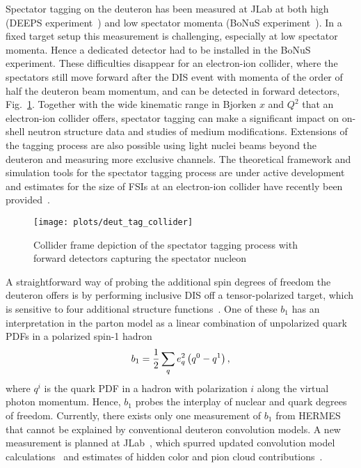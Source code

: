 Spectator tagging on the deuteron has been measured at JLab at both high (DEEPS experiment~\cite{Klimenko:2005zz}) and low spectator momenta (BoNuS experiment~\cite{Baillie:2011za}). In a fixed target setup this measurement is challenging, especially at low spectator momenta. Hence a dedicated detector had to be installed in the BoNuS experiment.  These difficulties disappear for an electron-ion collider, where the spectators still move forward after the DIS event with momenta of the order of half the deuteron beam momentum, and can be detected in forward detectors, Fig.~\ref{fig:collider}.  Together with the wide kinematic range in Bjorken $x$ and $Q^2$ that an electron-ion collider offers, spectator tagging can make a significant impact on on-shell neutron structure data and studies of medium modifications.  Extensions of the tagging process are also possible using light nuclei beams beyond the deuteron and measuring more exclusive channels.  The theoretical framework and simulation tools for the spectator tagging process are under active development~\cite{deutLDRD,Guzey:2014jva,Cosyn:2016oiq} and estimates for the size of FSIs at an electron-ion collider have recently been provided~\cite{Strikman:2017koc}.

\begin{figure}[tbp]
\centering\texttt{[image: plots/deut\_tag\_collider]}
\caption{Collider frame depiction of the spectator tagging process with forward detectors capturing the spectator nucleon~\cite{deutLDRD}}
\label{fig:collider}
\end{figure}

A straightforward way of probing the additional spin degrees of freedom the deuteron offers is by performing inclusive DIS off a tensor-polarized target, which is sensitive to four additional structure functions~\cite{Hoodbhoy:1988am}.  One of these $b_1$ has an interpretation in the parton model as a linear combination of unpolarized quark PDFs in a polarized spin-1 hadron
%
\begin{equation}
b_1=\frac{1}{2}\sum_q e_q^2\left(q^0-q^1\right),
\end{equation}
%
where $q^i$ is the quark PDF in a hadron with polarization $i$ along the virtual photon momentum.  Hence, $b_1$ probes the interplay of nuclear and quark degrees of freedom.  Currently, there exists only one measurement of $b_1$ from HERMES~\cite{Airapetian:2005cb} that cannot be explained by conventional deuteron convolution models.  A new measurement is planned at JLab~\cite{Slifer:2013vma}, which spurred updated convolution model calculations~\cite{Cosyn:2017fbo} and estimates of hidden color and pion cloud contributions~\cite{Miller:2013hla}.
